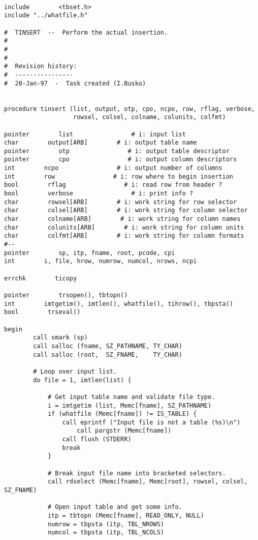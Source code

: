 \begin{verbatim}

include        <tbset.h>
include "../whatfile.h"

#  TINSERT  --  Perform the actual insertion.
#
#
#
#  Revision history:
#  ----------------
#  20-Jan-97  -  Task created (I.Busko)


procedure tinsert (list, output, otp, cpo, ncpo, row, rflag, verbose, 
                   rowsel, colsel, colname, colunits, colfmt)

pointer        list                # i: input list
char        output[ARB]        # i: output table name
pointer        otp                # i: output table descriptor
pointer        cpo                # i: output column descriptors
int        ncpo                # i: output number of columns
int        row                # i: row where to begin insertion
bool        rflag                # i: read row from header ?
bool        verbose                # i: print info ?
char        rowsel[ARB]        # i: work string for row selector
char        colsel[ARB]        # i: work string for column selector
char        colname[ARB]        # i: work string for column names
char        colunits[ARB]        # i: work string for column units
char        colfmt[ARB]        # i: work string for column formats
#--
pointer        sp, itp, fname, root, pcode, cpi
int        i, file, hrow, numrow, numcol, nrows, ncpi

errchk        ticopy

pointer        trsopen(), tbtopn()
int        imtgetim(), imtlen(), whatfile(), tihrow(), tbpsta()
bool        trseval()

begin
        call smark (sp)
        call salloc (fname, SZ_PATHNAME, TY_CHAR)
        call salloc (root,  SZ_FNAME,    TY_CHAR)

        # Loop over input list.
        do file = 1, imtlen(list) {

            # Get input table name and validate file type.
            i = imtgetim (list, Memc[fname], SZ_PATHNAME)
            if (whatfile (Memc[fname]) != IS_TABLE) {
                call eprintf ("Input file is not a table (%s)\n")
                    call pargstr (Memc[fname])
                call flush (STDERR)
                break
            }

            # Break input file name into bracketed selectors.
            call rdselect (Memc[fname], Memc[root], rowsel, colsel, SZ_FNAME)

            # Open input table and get some info.
            itp = tbtopn (Memc[fname], READ_ONLY, NULL)
            numrow = tbpsta (itp, TBL_NROWS)
            numcol = tbpsta (itp, TBL_NCOLS)


\end{verbatim}
